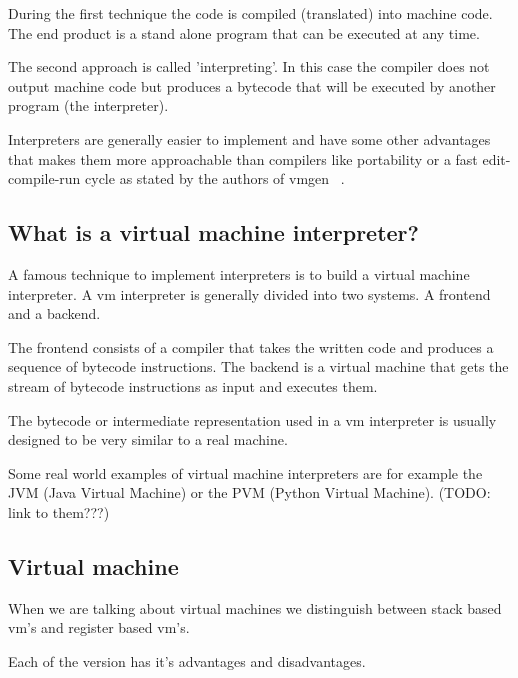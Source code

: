 \documentclass{article}
\begin{document}
During the first technique the code is compiled (translated) into machine code.
The end product is a stand alone program that can be executed at any time.


The second approach is called 'interpreting'. In this case the compiler does not
output machine code but produces a bytecode that will be executed by another
program (the interpreter).


Interpreters are generally easier to implement and have some other advantages
that makes them more approachable than compilers like portability or a fast
edit-compile-run cycle as stated by the authors of vmgen ~\cite{vmgen}. 


\subsection{What is a virtual machine interpreter?}
A famous technique to implement interpreters is to build a virtual machine
interpreter. A vm interpreter is generally divided into two systems. A frontend
and a backend. ~\cite{vmgen}

The frontend consists of a compiler that takes the written code and produces a
sequence of bytecode instructions. The backend is a virtual machine that gets
the stream of bytecode instructions as input and executes them. ~\cite{vmgen}

The bytecode or intermediate representation used in a vm interpreter is usually
designed to be very similar to a real machine. ~\cite{vmgen}

Some real world examples of virtual machine interpreters are for example the
JVM (Java Virtual Machine) or the PVM (Python Virtual Machine). (TODO: link to them???)


\subsection{Virtual machine}
When we are talking about virtual machines we distinguish between stack based vm's and 
register based vm's.

Each of the version has it's advantages and disadvantages.
\end{document}
